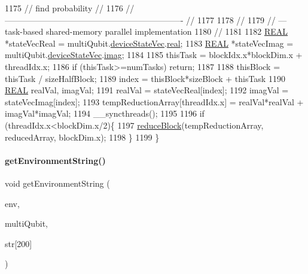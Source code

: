 \begin{DoxyCode}
1175     \textcolor{comment}{//            find probability                                      //}
1176     \textcolor{comment}{// ---------------------------------------------------------------- //}
1177 
1178     \textcolor{comment}{//}
1179     \textcolor{comment}{// --- task-based shared-memory parallel implementation}
1180     \textcolor{comment}{//}
1181 
1182     \mbox{\hyperlink{QuEST__precision_8h_a4b654506f18b8bfd61ad2a29a7e38c25}{REAL}} *stateVecReal = multiQubit.\mbox{\hyperlink{structMultiQubit_a59ac613486a41b8c9a4b6e79cc8d2cc3}{deviceStateVec}}.\mbox{\hyperlink{structComplexArray_a4195cac6c784ea1b6271f1c7dba1548a}{real}};
1183     \mbox{\hyperlink{QuEST__precision_8h_a4b654506f18b8bfd61ad2a29a7e38c25}{REAL}} *stateVecImag = multiQubit.\mbox{\hyperlink{structMultiQubit_a59ac613486a41b8c9a4b6e79cc8d2cc3}{deviceStateVec}}.\mbox{\hyperlink{structComplexArray_a79dde47c7ae530c79cebfdf57b225968}{imag}};
1184 
1185     thisTask = blockIdx.x*blockDim.x + threadIdx.x;
1186     \textcolor{keywordflow}{if} (thisTask>=numTasks) \textcolor{keywordflow}{return};
1187 
1188     thisBlock = thisTask / sizeHalfBlock;
1189     index     = thisBlock*sizeBlock + thisTask%
1190     \mbox{\hyperlink{QuEST__precision_8h_a4b654506f18b8bfd61ad2a29a7e38c25}{REAL}} realVal, imagVal;
1191     realVal = stateVecReal[index];
1192     imagVal = stateVecImag[index];      
1193     tempReductionArray[threadIdx.x] = realVal*realVal + imagVal*imagVal;
1194     \_\_syncthreads();
1195 
1196     \textcolor{keywordflow}{if} (threadIdx.x<blockDim.x/2)\{
1197         \mbox{\hyperlink{QuEST__env__localGPU_8cu_a4c740fa3ae25c71c1736790c674bdc98}{reduceBlock}}(tempReductionArray, reducedArray, blockDim.x);
1198     \}
1199 \}
\end{DoxyCode}
\mbox{\label{QuEST__env__localGPU_8cu_a8f10aabf9f607f19093aee54630caa21}} 
\paragraph{\texorpdfstring{get\+Environment\+String()}{getEnvironmentString()}}
{\footnotesize\ttfamily void get\+Environment\+String (\begin{DoxyParamCaption}\item[{\mbox{\hyperlink{structQuESTEnv}{Qu\+E\+S\+T\+Env}}}]{env,  }\item[{\mbox{\hyperlink{structMultiQubit}{Multi\+Qubit}}}]{multi\+Qubit,  }\item[{char}]{str\mbox{[}200\mbox{]} }\end{DoxyParamCaption})}



